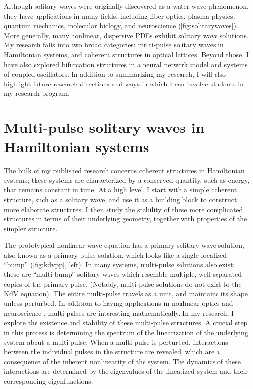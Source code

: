 \documentclass[12pt,reqno,oneside,hidelinks]{article}
\begin{document}
Although solitary waves were originally discovered as a water wave phenomenon, they have applications in many fields, including fiber optics, plasma physics, quantum mechanics, molecular biology, and neuroscience (\cref{fig:solitarywaves}). More generally, many nonlinear, dispersive PDEs exhibit solitary wave solutions. My research falls into two broad categories: multi-pulse solitary waves in Hamiltonian systems, and coherent structures in optical lattices. Beyond those, I have also explored bifurcation structures in a neural network model and systems of coupled oscillators. In addition to summarizing my research, I will also highlight future research directions and ways in which I can involve students in my research program.

\section*{Multi-pulse solitary waves in Hamiltonian systems}

The bulk of my published research concerns coherent structures in Hamiltonian systems; these systems are characterized by a conserved quantity, such as energy, that remains constant in time. At a high level, I start with a simple coherent structure, such as a solitary wave, and use it as a building block to construct more elaborate structures. I then study the stability of these more complicated structures in terms of their underlying geometry, together with properties of the simpler structure. 

The prototypical nonlinear wave equation has a primary solitary wave solution, also known as a primary pulse solution, which looks like a single localized ``bump'' (\cref{fig:kdvpp}, left). In many systems, multi-pulse solutions also exist; these are ``multi-bump'' solitary waves which resemble multiple, well-separated copies of the primary pulse. (Notably, multi-pulse solutions do not exist to the KdV equation). The entire multi-pulse travels as a unit, and maintains its shape unless perturbed. In addition to having applications in nonlinear optics and neuroscience \cite{Evans1982}, multi-pulses are interesting mathematically. In my research, I explore the existence and stability of these multi-pulse structures. A crucial step in this process is determining the spectrum of the linearization of the underlying system about a multi-pulse. When a multi-pulse is perturbed, interactions between the individual pulses in the structure are revealed, which are a consequence of the inherent nonlinearity of the system. The dynamics of these interactions are determined by the eigenvalues of the linearized system and their corresponding eigenfunctions.
\end{document}
